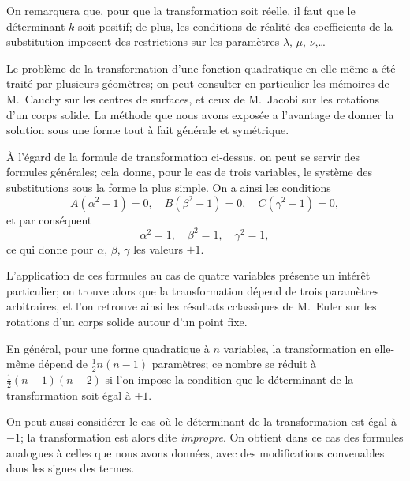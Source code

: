 \documentclass[11pt,a4paper]{article}
\theoremstyle{definition}
\begin{document}
\medskip

On remarquera que, pour que la transformation soit r\'eelle, il faut que
le d\'eterminant $k$ soit positif; de plus, les conditions de r\'ealit\'e
des coefficients de la substitution imposent des restrictions sur les
param\`etres $\lambda$, $\mu$, $\nu$,\ldots

\medskip

Le probl\`eme de la transformation d'une fonction quadratique en
elle-m\^eme a \'et\'e trait\'e par plusieurs g\'eom\`etres; on peut consulter
en particulier les m\'emoires de M.~Cauchy sur les centres de surfaces, et
ceux de M.~Jacobi sur les rotations d'un corps solide. La m\'ethode que
nous avons expos\'ee a l'avantage de donner la solution sous une forme
tout \`a fait g\'en\'erale et sym\'etrique.

\medskip

\`A l'\'egard de la formule de transformation ci-dessus, on peut se servir
des formules g\'en\'erales; cela donne, pour le cas de trois variables,
le syst\`eme des substitutions sous la forme la plus simple. On a ainsi
les conditions
\[
A(\alpha^2-1) = 0,\quad B(\beta^2-1) = 0,\quad C(\gamma^2-1) = 0,
\]
et par cons\'equent
\[
\alpha^2 = 1,\quad \beta^2 = 1,\quad \gamma^2 = 1,
\]
ce qui donne pour $\alpha$, $\beta$, $\gamma$ les valeurs $\pm 1$.

\medskip

L'application de ces formules au cas de quatre variables pr\'esente un
int\'er\^et particulier; on trouve alors que la transformation d\'epend de
trois param\`etres arbitraires, et l'on retrouve ainsi les r\'esultats
cclassiques de M.~Euler sur les rotations d'un corps solide autour d'un
point fixe.

\medskip

En g\'en\'eral, pour une forme quadratique \`a $n$ variables, la
transformation en elle-m\^eme d\'epend de $\tfrac{1}{2}n(n-1)$ param\`etres;
ce nombre se r\'eduit \`a $\tfrac{1}{2}(n-1)(n-2)$ si l'on impose la
condition que le d\'eterminant de la transformation soit \'egal \`a $+1$.

\medskip

On peut aussi consid\'erer le cas o\`u le d\'eterminant de la transformation
est \'egal \`a $-1$; la transformation est alors dite \textit{impropre}.
On obtient dans ce cas des formules analogues \`a celles que nous avons
donn\'ees, avec des modifications convenables dans les signes des termes.

\newpage
\end{document}

